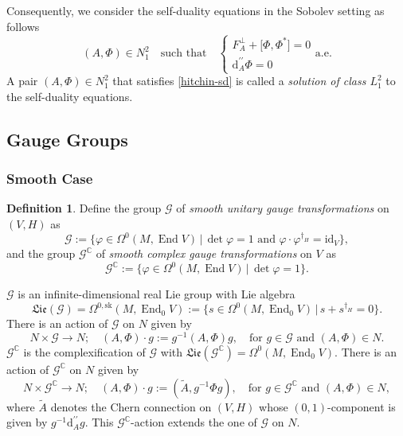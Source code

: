 \documentclass[a4paper]{amsart}
\theoremstyle{definition}
\newtheorem{definition}[theorem]{Definition}
\theoremstyle{remark}
\numberwithin{equation}{section}
\begin{document}
Consequently, we consider the self-duality equations in the Sobolev setting as follows
\begin{equation}
(A, \Phi) \in N_1^2 \quad \text{such that} \quad
\begin{cases}
F_A^{\perp} + \big[\Phi, \Phi^*\big] = 0 \\
\mathrm{d}_A^{\prime\prime} \Phi = 0
\end{cases} \label{hitchin-sd}\text{a.e.}
\end{equation}
A pair $(A, \Phi) \in N_1^2$ that satisfies \eqref{hitchin-sd} is called a {\it solution of class $L_1^2$} to the self-duality equations.
\subsection{Gauge Groups}

\subsubsection{Smooth Case}
\begin{definition}
Define the group $\mathscr{G}$ of \textit{smooth unitary gauge transformations} on $(V, H)$ as
\[
\mathscr{G} := \Big\{ \varphi \in \Omega^0(M, \operatorname{End} V) \,\Big|\, \det \varphi = 1 \text{ and } \varphi \cdot \varphi^{\dagger_H} = \mathrm{id}_V \Big\},
\]
and the group ${\mathscr{G}}^\mathbb{C}$ of \textit{smooth complex gauge transformations} on $V$ as
\[
{\mathscr{G}}^\mathbb{C} := \Big\{ \varphi \in \Omega^0(M, \operatorname{End} V) \,\Big|\, \det \varphi = 1 \Big\}.
\]
\end{definition}

$\mathscr{G}$ is an infinite-dimensional real Lie group with Lie algebra 
\[
\mathfrak{Lie}(\mathscr{G}) = \Omega^{0, \text{sk}}(M, \operatorname{End}_0 V):=\Big\{ s \in \Omega^0(M, \operatorname{End}_0 V) \,\Big|\, s+s^{\dagger_H}=0 \Big\}.
\]
There is an action of $\mathscr{G}$ on $N$ given by  
\[
N \times \mathscr{G} \to N ; \quad (A, \Phi) \cdot g := g^{-1} (A, \Phi) g, \quad \text{for } g \in \mathscr{G} \text{ and } (A,\Phi) \in N.
\]
${\mathscr{G}}^\mathbb{C}$ is the complexification of $\mathscr{G}$ with $\mathfrak{Lie}({\mathscr{G}}^\mathbb{C}) = \Omega^0(M, \operatorname{End}_0 V)$. There is an action of ${\mathscr{G}}^{\mathbb{C}}$ on $N$ given by  
\begin{equation}
N \times \mathscr{G}^\mathbb{C} \to N ; \quad (A, \Phi) \cdot g := (\tilde{A}, g^{-1} \Phi g), \quad \text{for } g \in {\mathscr{G}}^{\mathbb{C}} \text{ and } (A,\Phi) \in N, \label{cg action}
\end{equation}
where  $\tilde{A}$ denotes the Chern connection on $(V, H)$ whose $(0,1)$-component is given by $g^{-1} \mathrm{d}_A^{\prime\prime} g$.
This ${\mathscr{G}}^\mathbb{C}$-action  extends the one of $\mathscr{G}$ on $N$. 
\end{document}
